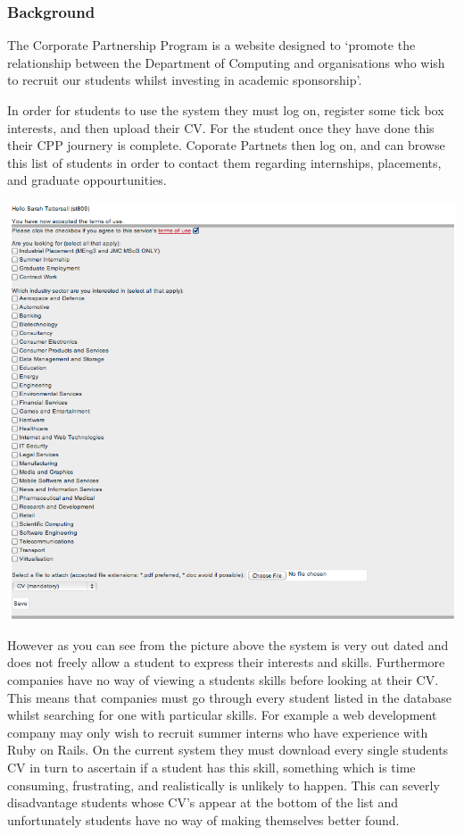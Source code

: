 \subsubsection{Background}
The Corporate Partnership Program is a website designed to `promote the relationship between the Department of Computing and organisations who wish to recruit our students whilst investing in academic sponsorship'\cite{doc-cpp}.

In order for students to use the system they must log on, register some tick box interests, and then upload their CV.
For the student once they have done this their CPP journery is complete.
Coporate Partnets then log on, and can browse this list of students in order to contact them regarding internships, placements, and graduate oppourtunities.

\includegraphics[scale=0.5]{images/introduction/old_cpp}

However as you can see from the picture above the system is very out dated and does not freely allow a student to express their interests and skills. Furthermore companies have no way of viewing a students skills before looking at their CV. This means that companies must go through every student listed in the database whilst searching for one with particular skills. For example a web development company may only wish to recruit summer interns who have experience with Ruby on Rails. On the current system they must download every single students CV in turn to ascertain if a student has this skill, something which is time consuming, frustrating, and realistically is unlikely to happen.
This can severly disadvantage students whose CV's appear at the bottom of the list and unfortunately students have
no way of making themselves better found.

